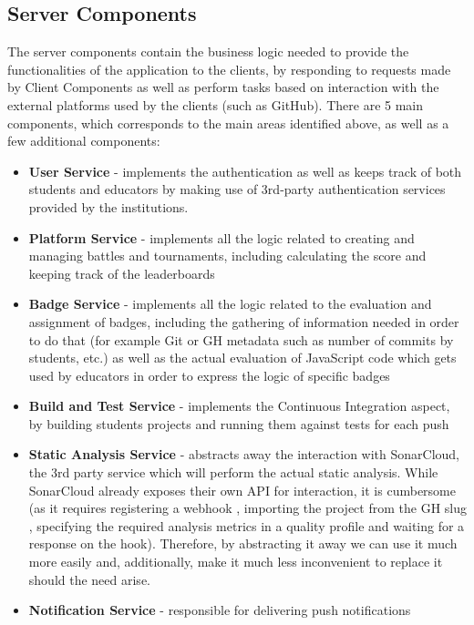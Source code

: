 \subsection{Server Components}
The server components contain the business logic needed to provide the functionalities of the application to the clients,
by responding to requests made by Client Components as well as perform tasks based on interaction with the external
platforms used by the clients (such as GitHub). There are 5 main components, which corresponds to the main areas identified
above, as well as a few additional components:
\begin{itemize}
    \item \textbf{User Service} {-} implements the authentication as well as keeps track of both students and educators by making
          use of 3rd-party authentication services provided by the institutions.
    \item \textbf{Platform Service} {-} implements all the logic related to creating and managing battles and tournaments, including
          calculating the score and keeping track of the leaderboards
    \item \textbf{Badge Service} {-} implements all the logic related to the evaluation and assignment of badges, including the gathering
          of information needed in order to do that (for example Git or GH metadata such as number of commits by students, etc.)
          as well as the actual evaluation of JavaScript code which gets used by educators in order to express the logic of
          specific badges
    \item \textbf{Build and Test Service} {-} implements the Continuous Integration aspect, by building students projects and
          running them against tests for each push
    \item \textbf{Static Analysis Service} {-} abstracts away the interaction with SonarCloud, the 3rd party service which will
          perform the actual static analysis. While SonarCloud already exposes their own API for interaction, it is cumbersome
          (as it requires registering a webhook \cite{SonarCloudWh}, importing the project from the GH slug \cite{SonarCloudGh},
          specifying the required analysis metrics in a quality profile \cite{SonarCloudQp} and waiting for a response on the hook).
          Therefore, by abstracting it away we can use it much more easily and, additionally, make it much less inconvenient to
          replace it should the need arise.
    \item \textbf{Notification Service} {-} responsible for delivering push notifications

\end{itemize}
